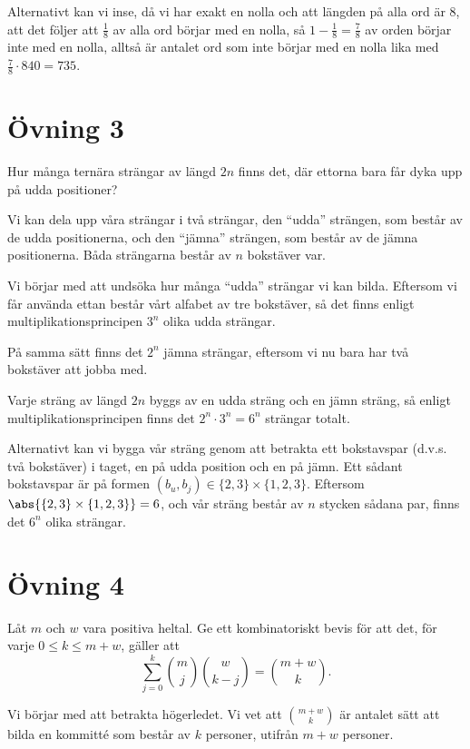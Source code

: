 \documentclass{article}
\begin{document}
Alternativt kan vi inse, då vi har exakt en nolla och att längden på alla ord är $8$, att det följer att $\frac{1}{8}$ av alla ord börjar med en nolla, så $1-\frac{1}{8}=\frac{7}{8}$ av orden börjar inte med en nolla, alltså är antalet ord som inte börjar med en nolla lika med $\frac{7}{8}\cdot 840=735$.

\section*{Övning 3}
\begin{xca}
  Hur många ternära strängar av längd $2n$ finns det, där ettorna bara får dyka upp på udda positioner?
\end{xca}

Vi kan dela upp våra strängar i två strängar, den ``udda'' strängen, som består av de udda positionerna, och den ``jämna'' strängen, som består av de jämna positionerna. Båda strängarna består av $n$ bokstäver var. 

Vi börjar med att undsöka hur många ``udda'' strängar vi kan bilda. Eftersom vi får använda ettan består vårt alfabet av tre bokstäver, så det finns enligt multiplikationsprincipen $3^n$ olika udda strängar. 

På samma sätt finns det $2^n$ jämna strängar, eftersom vi nu bara har två bokstäver att jobba med. 

Varje sträng av längd $2n$ byggs av en udda sträng och en jämn sträng, så enligt multiplikationsprincipen finns det $2^n\cdot 3^n=6^n$ strängar totalt. 

Alternativt kan vi bygga vår sträng genom att betrakta ett bokstavspar (d.v.s. två bokstäver) i taget, en på udda position och en på jämn. Ett sådant bokstavspar är på formen $(b_u, b_j)\in \{2, 3\}\times \{1, 2, 3\}$. Eftersom $\abs{\{2, 3\}\times \{1, 2, 3\}}=6$, och vår sträng består av $n$ stycken sådana par, finns det $6^n$ olika strängar. 

\section*{Övning 4}

\begin{xca}
  Låt $m$ och $w$ vara positiva heltal. Ge ett kombinatoriskt bevis för att det, för varje $0 \leq k \leq m + w$, gäller att
  $$\sum_{j=0}^k \binom{m}{j}\binom{w}{k-j} = \binom{m + w}{k}.$$
\end{xca}

Vi börjar med att betrakta högerledet. Vi vet att $m + w \choose k$ är antalet sätt att bilda en kommitté som består av $k$ personer, utifrån $m + w$ personer. 
\end{document}
